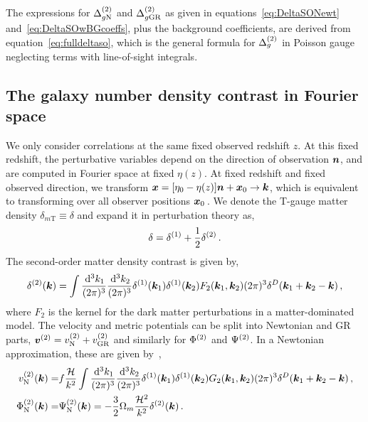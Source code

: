 The expressions for $\Delta^{(2)}_{g\mathrm{N}}$ and $\Delta^{(2)}_{g\mathrm{GR}}$ as given in equations~\eqref{eq:DeltaSONewt} and~\eqref{eq:DeltaSOwBGcoeffs}, plus the background coefficients, are derived from equation~\eqref{eq:fulldeltaso}, which is the general formula for $\Delta_g^{(2)}$ in Poisson gauge neglecting terms with line-of-sight integrals. 

\subsection{The galaxy number density contrast in Fourier space}
We only consider correlations at the same fixed observed redshift $z$. At this fixed redshift, the perturbative variables depend on the direction of observation $\bm {n}$, and are computed in Fourier space at fixed $\eta(z)$. At fixed redshift and fixed observed direction, we transform $\bm {x} = [\eta_0 - \eta(z)]\bm {n} + \bm {x}_0 \to \bm {k}$, which is equivalent to transforming over all observer positions $\bm {x}_0$\,. We denote the T-gauge matter density $\delta_{m\mathrm{T}} \equiv \delta$ and expand it in perturbation theory as, 
\begin{equation}
	\delta = \delta^{(1)} + \frac{1}{2} \delta^{(2)}\,.
\end{equation}
The second-order matter density contrast is given by,
\begin{equation}
	\delta^{(2)}(\bm {k}) = \int \frac{\,\mathrm{d}^3 k_1}{(2\pi)^3} \frac{\,\mathrm{d}^3 k_2}{(2\pi)^3} \delta^{(1)}(\bm {k}_1) \delta^{(1)}(\bm {k}_2) F_2(\bm {k}_1,\bm {k}_2)(2\pi)^3 \delta^D(\bm {k}_1+\bm {k}_2-\bm {k})\,,
\end{equation}
where $F_2$ is the kernel for the dark matter perturbations in a matter-dominated model.
The velocity and metric potentials can be split into Newtonian and GR parts, $\bm{v}^{(2)} = v_{\mathrm{N}}^{(2)} + v_{\mathrm{GR}}^{(2)}$ and similarly for $\Phi^{(2)}$ and $\Psi^{(2)}$. In a Newtonian approximation, these are given by~\cite{Bernardeau:2001qr}, 
\begin{align}
	v^{(2)}_{\mathrm{N}}(\bm {k}) =& f \frac{\mathcal{H}}{k^2} \int \frac{\,\mathrm{d}^3 k_1}{(2\pi)^3} \frac{\,\mathrm{d}^3 k_2}{(2\pi)^3} \delta^{(1)}(\bm {k}_1) \delta^{(1)}(\bm {k}_2) G_2(\bm {k}_1,\bm {k}_2) (2\pi)^3 \delta^D(\bm {k}_1+\bm {k}_2-\bm {k})\,,\\
	\Phi^{(2)}_{\mathrm{N}}(\bm {k}) =& \Psi^{(2)}_{\mathrm{N}}(\bm {k}) = - \frac{3}{2} \Omega_m \frac{\mathcal{H}^2}{k^2} \delta^{(2)}(\bm {k})\,.\label{eq:PsiSOnewtFT}
\end{align}

